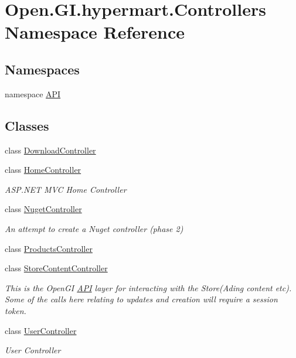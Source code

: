 \hypertarget{namespace_open_1_1_g_i_1_1hypermart_1_1_controllers}{}\section{Open.\+G\+I.\+hypermart.\+Controllers Namespace Reference}
\label{namespace_open_1_1_g_i_1_1hypermart_1_1_controllers}
\subsection*{Namespaces}
\begin{DoxyCompactItemize}
\item 
namespace \hyperlink{namespace_open_1_1_g_i_1_1hypermart_1_1_controllers_1_1_a_p_i}{A\+P\+I}
\end{DoxyCompactItemize}
\subsection*{Classes}
\begin{DoxyCompactItemize}
\item 
class \hyperlink{class_open_1_1_g_i_1_1hypermart_1_1_controllers_1_1_download_controller}{Download\+Controller}
\item 
class \hyperlink{class_open_1_1_g_i_1_1hypermart_1_1_controllers_1_1_home_controller}{Home\+Controller}
\begin{DoxyCompactList}\small\item\em A\+S\+P.\+N\+E\+T M\+V\+C Home Controller \end{DoxyCompactList}\item 
class \hyperlink{class_open_1_1_g_i_1_1hypermart_1_1_controllers_1_1_nuget_controller}{Nuget\+Controller}
\begin{DoxyCompactList}\small\item\em An attempt to create a Nuget controller (phase 2) \end{DoxyCompactList}\item 
class \hyperlink{class_open_1_1_g_i_1_1hypermart_1_1_controllers_1_1_products_controller}{Products\+Controller}
\item 
class \hyperlink{class_open_1_1_g_i_1_1hypermart_1_1_controllers_1_1_store_content_controller}{Store\+Content\+Controller}
\begin{DoxyCompactList}\small\item\em This is the Open\+G\+I \hyperlink{namespace_open_1_1_g_i_1_1hypermart_1_1_controllers_1_1_a_p_i}{A\+P\+I} layer for interacting with the Store(\+Ading content etc). Some of the calls here relating to updates and creation will require a session token. \end{DoxyCompactList}\item 
class \hyperlink{class_open_1_1_g_i_1_1hypermart_1_1_controllers_1_1_user_controller}{User\+Controller}
\begin{DoxyCompactList}\small\item\em User Controller \end{DoxyCompactList}\end{DoxyCompactItemize}
